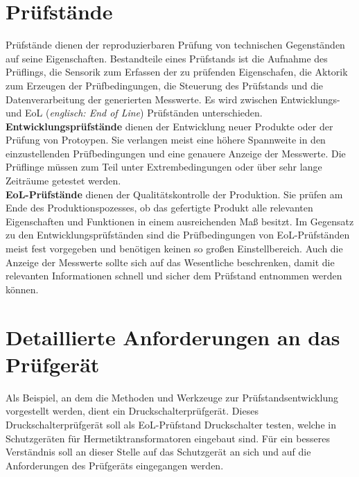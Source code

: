\section{Prüfstände}
Prüfstände dienen der reproduzierbaren Prüfung von technischen Gegenständen auf seine Eigenschaften.
Bestandteile eines Prüfstands ist die Aufnahme des Prüflings, die Sensorik zum Erfassen der zu prüfenden Eigenschafen,
die Aktorik zum Erzeugen der Prüfbedingungen, die Steuerung des Prüfstands
und die Datenverarbeitung der generierten Messwerte. Es wird zwischen Entwicklungs- und EoL
(\textit{englisch: End of Line}) Prüfständen unterschieden.
\\
\textbf{Entwicklungsprüfstände} dienen der Entwicklung neuer Produkte oder der Prüfung von Protoypen.
Sie verlangen meist eine höhere Spannweite in den einzustellenden Prüfbedingungen und eine genauere
Anzeige der Messwerte. Die Prüflinge müssen zum Teil unter Extrembedingungen oder über sehr lange Zeiträume
getestet werden.
\\
\textbf{EoL-Prüfstände} dienen der Qualitätskontrolle der Produktion. Sie prüfen am Ende des Produktionspozesses,
ob das gefertigte Produkt alle relevanten Eigenschaften und Funktionen in einem ausreichenden Maß besitzt.
Im Gegensatz zu den Entwicklungsprüfständen sind die Prüfbedingungen von EoL-Prüfständen meist fest vorgegeben
und benötigen keinen so großen Einstellbereich. Auch die Anzeige der Messwerte sollte sich auf das Wesentliche
beschrenken, damit die relevanten Informationen schnell und sicher dem Prüfstand entnommen werden können.

\section{Detaillierte Anforderungen an das Prüfgerät}
Als Beispiel, an dem die Methoden und Werkzeuge zur Prüfstandsentwicklung vorgestellt werden,
dient ein Druckschalterprüfgerät. Dieses Druckschalterprüfgerät soll als EoL-Prüfstand Druckschalter
testen, welche in Schutzgeräten für Hermetiktransformatoren eingebaut sind. Für ein besseres Verständnis
soll an dieser Stelle auf das Schutzgerät an sich und auf die Anforderungen des Prüfgeräts eingegangen werden.

